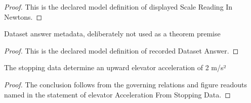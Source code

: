 \begin{proof}
  This is the declared model definition of displayed Scale Reading In Newtons.
\end{proof}
\begin{definition}
  \label{def:physics:phyx-mini-0803:phyxminiproblems-problemphyxmini0803-recordeddatasetanswer}
  Dataset answer metadata, deliberately not used as a theorem premise
\end{definition}
\begin{proof}
  This is the declared model definition of recorded Dataset Answer.
\end{proof}
\begin{lemma}
  \label{lem:physics:phyx-mini-0803:phyxminiproblems-problemphyxmini0803-elevatoraccelerationfromstoppingdata}
  The stopping data determine an upward elevator acceleration of 2 m/s²
\end{lemma}
\begin{proof}
  The conclusion follows from the governing relations and figure readouts named in the statement of elevator Acceleration From Stopping Data.
\end{proof}
